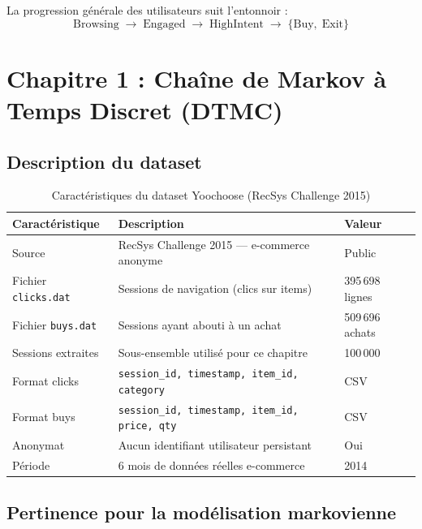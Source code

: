 \documentclass[11pt,a4paper]{article}
\begin{document}
La progression générale des utilisateurs suit l'entonnoir :
\[
\text{Browsing} \;\rightarrow\; \text{Engaged} \;\rightarrow\; \text{HighIntent}
\;\rightarrow\; \{\text{Buy},\; \text{Exit}\}
\]

\newpage

\section{Chapitre 1 : Chaîne de Markov à Temps Discret (DTMC)}

\subsection{Description du dataset}

\begin{table}[H]
\centering
\caption{Caractéristiques du dataset Yoochoose (RecSys Challenge 2015)}
\label{tab:dataset}
\begin{tabularx}{\textwidth}{lXl}
\toprule
\rowcolor{DarkBlue}
\color{white}\textbf{Caractéristique} &
\color{white}\textbf{Description} &
\color{white}\textbf{Valeur} \\
\midrule
\rowcolor{LightBlue}
Source       & RecSys Challenge 2015 --- e-commerce anonyme & Public \\
Fichier \texttt{clicks.dat} & Sessions de navigation (clics sur items) & 395\,698 lignes \\
\rowcolor{LightBlue}
Fichier \texttt{buys.dat}   & Sessions ayant abouti à un achat        & 509\,696 achats \\
Sessions extraites          & Sous-ensemble utilisé pour ce chapitre  & 100\,000 \\
\rowcolor{LightBlue}
Format clicks  & \texttt{session\_id, timestamp, item\_id, category} & CSV \\
Format buys    & \texttt{session\_id, timestamp, item\_id, price, qty} & CSV \\
\rowcolor{LightBlue}
Anonymat       & Aucun identifiant utilisateur persistant & Oui \\
Période        & 6 mois de données réelles e-commerce & 2014 \\
\bottomrule
\end{tabularx}
\end{table}

\subsection{Pertinence pour la modélisation markovienne}
\end{document}

